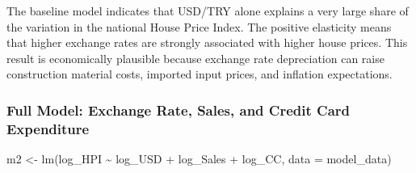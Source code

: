 \documentclass[
  11pt,
  a4paper,
  DIV=11,
  numbers=noendperiod]{scrartcl}
\newenvironment{Shaded}{\begin{snugshade}}{\end{snugshade}}
\newcommand{\AttributeTok}[1]{\textcolor[rgb]{0.40,0.45,0.13}{#1}}
\newcommand{\FunctionTok}[1]{\textcolor[rgb]{0.28,0.35,0.67}{#1}}
\newcommand{\NormalTok}[1]{\textcolor[rgb]{0.00,0.23,0.31}{#1}}
\newcommand{\OtherTok}[1]{\textcolor[rgb]{0.00,0.23,0.31}{#1}}
\newcommand{\SpecialCharTok}[1]{\textcolor[rgb]{0.37,0.37,0.37}{#1}}
\begin{document}
The baseline model indicates that USD/TRY alone explains a very large
share of the variation in the national House Price Index. The positive
elasticity means that higher exchange rates are strongly associated with
higher house prices. This result is economically plausible because
exchange rate depreciation can raise construction material costs,
imported input prices, and inflation expectations.

\subsubsection{Full Model: Exchange Rate, Sales, and Credit Card
Expenditure}\label{full-model-exchange-rate-sales-and-credit-card-expenditure}

\begin{Shaded}
\begin{Highlighting}[]
\NormalTok{m2 }\OtherTok{\textless{}{-}} \FunctionTok{lm}\NormalTok{(log\_HPI }\SpecialCharTok{\textasciitilde{}}\NormalTok{ log\_USD }\SpecialCharTok{+}\NormalTok{ log\_Sales }\SpecialCharTok{+}\NormalTok{ log\_CC, }\AttributeTok{data =}\NormalTok{ model\_data)}


\end{Highlighting}
\end{Shaded}
\end{document}
